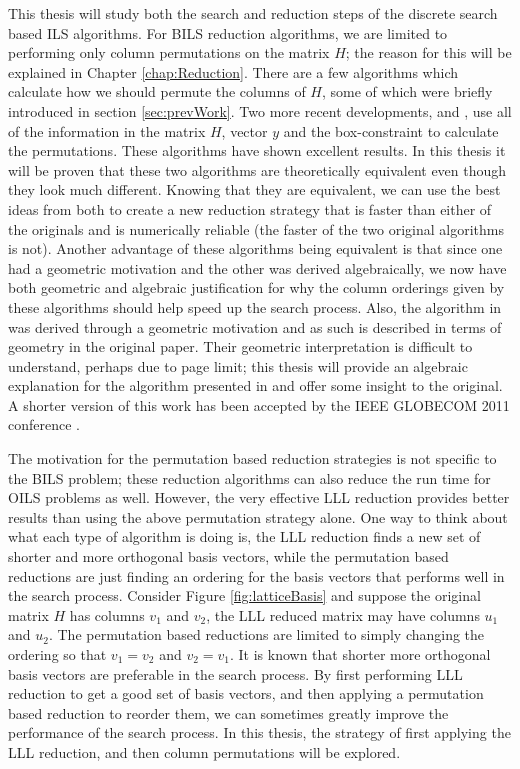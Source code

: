 \documentclass[12pt,Bold,letterpaper]{mcgilletdclass}
\begin{document}
This thesis will study both the search and reduction steps of the discrete search based ILS algorithms. For BILS reduction algorithms, we are limited to performing only column permutations on the matrix $H$; the reason for this will be explained in Chapter \ref{chap:Reduction}. There are a few algorithms which calculate how we should permute the columns of $H$, some of which were briefly introduced in section \ref{sec:prevWork}. Two more recent developments, \cite{ChaH05} and \cite{SuW05}, use all of the information in the matrix $H$, vector $y$ and the box-constraint to calculate the permutations. These algorithms have shown excellent results. In this thesis it will be proven that these two algorithms are theoretically equivalent even though they look much different. Knowing that they are equivalent, we can use the best ideas from both to create a new reduction strategy that is faster than either of the originals and is numerically reliable (the faster of the two original algorithms is not). Another advantage of these algorithms being equivalent is that since one had a geometric motivation and the other was derived algebraically, we now have both geometric and algebraic justification for why the column orderings given by these algorithms should help speed up the search process. Also, the algorithm in \cite{SuW05} was derived through a geometric motivation and as such is described in terms of geometry in the original paper. Their geometric interpretation is difficult to understand, perhaps due to page limit; this thesis will provide an algebraic explanation for the algorithm presented in \cite{SuW05} and offer some insight to the original. A shorter version of this work has been accepted by the IEEE GLOBECOM 2011 conference \cite{BreC11}.

The motivation for the permutation based reduction strategies is not specific to the BILS problem; these reduction algorithms can also reduce the run time for OILS problems as well. However, the very effective LLL reduction provides better results than using the above permutation strategy alone. One way to think about what each type of algorithm is doing is, the LLL reduction finds a new set of shorter and more orthogonal basis vectors, while the permutation based reductions are just finding an ordering for the basis vectors that performs well in the search process. Consider Figure \ref{fig:latticeBasis} and suppose the original matrix $H$ has columns $v_1$ and $v_2$, the LLL reduced matrix may have columns $u_1$ and $u_2$. The permutation based reductions are limited to simply changing the ordering so that $v_1 = v_2$ and $v_2 = v_1$. It is known that shorter more orthogonal basis vectors are preferable in the search process. By first performing LLL reduction to get a good set of basis vectors, and then applying a permutation based reduction to reorder them, we can sometimes greatly improve the performance of the search process. In this thesis, the strategy of first applying the LLL reduction, and then column permutations will be explored.
\end{document}

